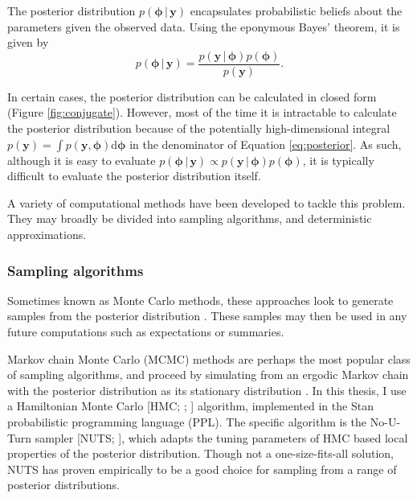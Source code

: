 \documentclass[a4paper, nobind]{templates/ociamthesis}
\begin{document}
The posterior distribution \(p(\boldsymbol{\mathbf{\phi}} \, | \, \mathbf{y})\) encapsulates probabilistic beliefs about the parameters given the observed data.
Using the eponymous Bayes' theorem, it is given by
\begin{equation}
p(\boldsymbol{\mathbf{\phi}} \, | \, \mathbf{y}) = \frac{p(\mathbf{y} \, | \, \boldsymbol{\mathbf{\phi}}) p(\boldsymbol{\mathbf{\phi}})}{p(\mathbf{y})}. \label{eq:posterior}
\end{equation}

In certain cases, the posterior distribution can be calculated in closed form (Figure \ref{fig:conjugate}).
However, most of the time it is intractable to calculate the posterior distribution because of the potentially high-dimensional integral \(p(\mathbf{y}) = \int p(\mathbf{y}, \boldsymbol{\mathbf{\phi}}) \text{d}\boldsymbol{\mathbf{\phi}}\) in the denominator of Equation \eqref{eq:posterior}.
As such, although it is easy to evaluate \(p(\boldsymbol{\mathbf{\phi}} \, | \, \mathbf{y}) \propto p(\mathbf{y} \, | \, \boldsymbol{\mathbf{\phi}}) p(\boldsymbol{\mathbf{\phi}})\), it is typically difficult to evaluate the posterior distribution itself.

A variety of computational methods have been developed to tackle this problem.
They may broadly be divided into sampling algorithms, and deterministic approximations.

\hypertarget{sampling-algorithms}{%
\subsubsection{Sampling algorithms}\label{sampling-algorithms}}

Sometimes known as Monte Carlo methods, these approaches look to generate samples from the posterior distribution \autocite{robert2005monte}.
These samples may then be used in any future computations such as expectations or summaries.

Markov chain Monte Carlo (MCMC) methods are perhaps the most popular class of sampling algorithms, and proceed by simulating from an ergodic Markov chain with the posterior distribution as its stationary distribution \autocite{roberts2004general}.
In this thesis, I use a Hamiltonian Monte Carlo {[}HMC; \textcite{duane1987hybrid}; \textcite{neal2011mcmc}{]} algorithm, implemented in the Stan \autocite{carpenter2017stan} probabilistic programming language (PPL).
The specific algorithm is the No-U-Turn sampler {[}NUTS; \textcite{hoffman2014no}{]}, which adapts the tuning parameters of HMC based local properties of the posterior distribution.
Though not a one-size-fits-all solution, NUTS has proven empirically to be a good choice for sampling from a range of posterior distributions.
\end{document}
